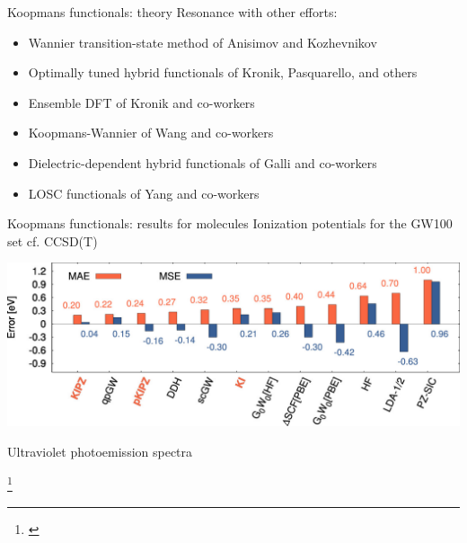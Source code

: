 \documentclass[xcolor=table,aspectratio=169]{beamer}
\newcommand\blfootcite[1]{%
  \begingroup
  \renewcommand\thefootnote{}\footnote{\hspace{-4ex}\cite{#1}}%
  \addtocounter{footnote}{-1}%
  \endgroup
}
\numberwithin{equation}{section}
\begin{document}
\begin{frame}{Koopmans functionals: theory}
   Resonance with other efforts:
   \begin{itemize}
      \item Wannier transition-state method of Anisimov and Kozhevnikov \cite{Anisimov2005}
      \item Optimally tuned hybrid functionals of Kronik, Pasquarello, and others \cite{Kronik2012,Wing2021}
      \item Ensemble DFT of Kronik and co-workers \cite{Kraisler2013}
      \item Koopmans-Wannier of Wang and co-workers \cite{Ma2016}
      \item Dielectric-dependent hybrid functionals of Galli and co-workers \cite{Skone2016a}
      \item LOSC functionals of Yang and co-workers \cite{Li2018}
   \end{itemize}
\end{frame}

\begin{frame}{Koopmans functionals: results for molecules}
   \small
   Ionization potentials for the GW100 set cf. CCSD(T)
   \begin{center}
      \includegraphics[height=0.2\textwidth]{figures/colonna_2019_gw100_ip}
   \end{center}

   \vspace{-3ex}
   Ultraviolet photoemission spectra
   \begin{center}
   \end{center}
   \vspace{-2ex}

   \blfootcite{Colonna2018,Nguyen2015}
\end{frame}
\end{document}
